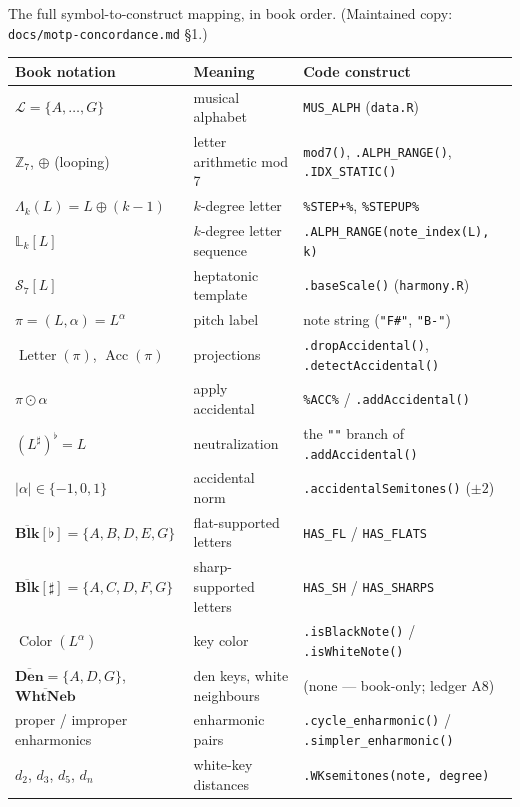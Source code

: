 \documentclass[11pt]{article}
\newcommand{\MAlph}{\mathcal{L}}                 %
\newcommand{\Lam}{\Lambda}                      %
\newcommand{\LSeq}{\mathbb{L}}                  %
\newcommand{\BL}{\overline{\textbf{Blk}}}       %
\newcommand{\DN}{\overline{\textbf{Den}}}       %
\newcommand{\WN}{\overline{\textbf{WhtNeb}}}    %
\newcommand{\Zseven}{\mathbb{Z}_7}
\newcommand{\Colorf}{\operatorname{Color}}
\newcommand{\Accf}{\operatorname{Acc}}
\newcommand{\Letterf}{\operatorname{Letter}}
\newcommand{\pit}{\pi}                          %
\theoremstyle{definition}
\theoremstyle{remark}
\newcommand{\code}[1]{\texttt{#1}}
\newcommand{\file}[1]{\texttt{#1}}
\begin{document}
The full symbol-to-construct mapping, in book order. (Maintained copy:
\file{docs/motp-concordance.md} \S1.)

\begin{center}
\renewcommand{\arraystretch}{1.4}
\small
\begin{tabular}{@{}p{4.1cm}p{4.1cm}p{5.2cm}@{}}
\toprule
\textbf{Book notation} & \textbf{Meaning} & \textbf{Code construct} \\
\midrule
$\MAlph = \{A, \dots, G\}$ & musical alphabet & \code{MUS\_ALPH} (\file{data.R}) \\
$\Zseven$, $\oplus$ (looping) & letter arithmetic mod 7 & \code{mod7()}, \code{.ALPH\_RANGE()}, \code{.IDX\_STATIC()} \\
$\Lam_k(L) = L \oplus (k-1)$ & $k$-degree letter & \code{\%STEP+\%}, \code{\%STEPUP\%} \\
$\LSeq_k[L]$ & $k$-degree letter sequence & \code{.ALPH\_RANGE(note\_index(L), k)} \\
$\mathcal{S}_7[L]$ & heptatonic template & \code{.baseScale()} (\file{harmony.R}) \\
$\pit = (L, \alpha) = L^{\alpha}$ & pitch label & note string (\code{"F\#"}, \code{"B-"}) \\
$\Letterf(\pit)$, $\Accf(\pit)$ & projections & \code{.dropAccidental()}, \code{.detectAccidental()} \\
$\pit \odot \alpha$ & apply accidental & \code{\%ACC\%} / \code{.addAccidental()} \\
$(L^{\sharp})^{\flat} = L$ & neutralization & the \code{""} branch of \code{.addAccidental()} \\
$|\alpha| \in \{-1, 0, 1\}$ & accidental norm & \code{.accidentalSemitones()} ($\pm 2$) \\
$\BL[\flat] = \{A,B,D,E,G\}$ & flat-supported letters & \code{HAS\_FL} / \code{HAS\_FLATS} \\
$\BL[\sharp] = \{A,C,D,F,G\}$ & sharp-supported letters & \code{HAS\_SH} / \code{HAS\_SHARPS} \\
$\Colorf(L^{\alpha})$ & key color & \code{.isBlackNote()} / \code{.isWhiteNote()} \\
$\DN = \{A, D, G\}$, $\WN$ & den keys, white neighbours & (none --- book-only; ledger A8) \\
proper / improper enharmonics & enharmonic pairs & \code{.cycle\_enharmonic()} / \code{.simpler\_enharmonic()} \\
$d_2$, $d_3$, $d_5$, $d_n$ & white-key distances & \code{.WKsemitones(note, degree)} \\

\end{tabular}
\end{center}
\end{document}
